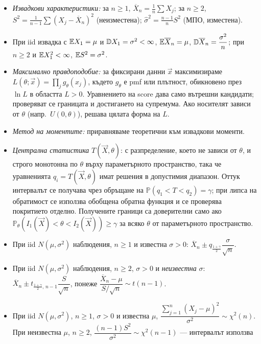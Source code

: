 \begin{itemize}\itemsep2pt
  \item \emph{Извадкови характеристики:} за $n\ge1$,
        $\overline{X}_n = \frac1n\sum X_j$; за $n\ge2$,
        $S^2 = \frac{1}{n-1}\sum (X_j - \overline{X}_n)^2$ (неизместена);\quad
        $\hat\sigma^2 = \frac{n-1}{n}S^2$ (МПО, изместена).
  \item При iid извадка с $\mathbb{E} X_1=\mu$ и $\mathbb{D} X_1=\sigma^2<\infty$,
        $\mathbb{E} \overline{X}_n = \mu$, $\mathbb{D} \overline{X}_n = \dfrac{\sigma^2}{n}$;\quad
        при $n\ge2$ и $\mathbb{E} X_1^2<\infty$, $\mathbb{E} S^2 = \sigma^2$.
  \item \emph{Максимално правдоподобие:} за фиксирани данни $\vec x$ максимизираме
        $L(\theta;\vec x)=\prod_j g_\theta(x_j)$, където $g_\theta$ е pmf или плътност,
        обикновено през $\ln L$ в областта $L>0$. Уравнението на score дава само
        вътрешни кандидати; проверяват се границата и достигането на супремума.
        Ако носителят зависи от $\theta$ (напр.\ $U(0,\theta)$), решава цялата форма на $L$.
  \item \emph{Метод на моментите:} приравняваме теоретични към извадкови моменти.
  \item \emph{Централна статистика} $T(\vec X,\theta)$: с разпределение,
        което не зависи от $\theta$, и строго монотонна по $\theta$ върху параметърното
        пространство, така че уравненията $q_i=T(\vec X,\theta)$ имат решения в
        допустимия диапазон. Оттук интервалът се получава чрез обръщане на
        $\mathbb{P}(q_1 < T < q_2) = \gamma$; при липса на обратимост се използва
        обобщена обратна функция и се проверява покритието отделно.
        Получените граници са доверителни само ако
        $\mathbb P_\theta(I_1(\vec X)<\theta<I_2(\vec X))\ge\gamma$ за всяко
        $\theta$ от параметърното пространство.
  \item При iid $N(\mu,\sigma^2)$ наблюдения, $n\ge1$ и известна $\sigma>0$:\;
        $\overline{X}_n \pm q_{\frac{1+\gamma}{2}}\dfrac{\sigma}{\sqrt{n}}$.
  \item При iid $N(\mu,\sigma^2)$ наблюдения, $n\ge2$, $\sigma>0$ и \emph{неизвестна} $\sigma$:\;
        $\overline{X}_n \pm t_{\frac{1+\gamma}{2},\,n-1}\dfrac{S}{\sqrt{n}}$, понеже
        $\dfrac{\overline{X}_n-\mu}{S/\sqrt{n}} \sim t(n-1)$.
  \item При iid $N(\mu,\sigma^2)$, $n\ge1$, $\sigma>0$ и известна $\mu$,
        $\dfrac{\sum_{j=1}^n(X_j-\mu)^2}{\sigma^2}\sim\chi^2(n)$.
        При неизвестна $\mu$, $n\ge2$,
        $\dfrac{(n-1)S^2}{\sigma^2} \sim \chi^2(n-1)$ — интервалът използва

\end{itemize}
